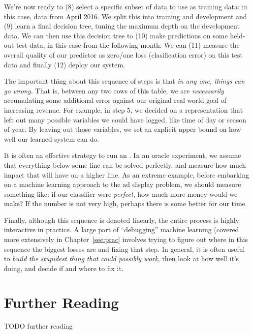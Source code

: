We're now ready to (8) select a specific subset of data to use as training data: in this case, data from April 2016. We split this into training and development and (9) learn a final decision tree, tuning the maximum depth on the development data. We can then use this decision tree to (10) make predictions on some held-out test data, in this case from the following month. We can (11) measure the overall quality of our predictor as zero/one loss (clasification error) on this test data and finally (12) deploy our system.

The important thing about this sequence of steps is that \emph{in any one, things can go wrong.} That is, between any two rows of this table, we are \emph{necessarily} accumulating some additional error against our original real world goal of increasing revenue. For example, in step 5, we decided on a representation that left out many possible variables we could have logged, like time of day or season of year. By leaving out those variables, we set an explicit upper bound on how well our learned system can do.

It is often an effective strategy to run an . In an oracle experiment, we assume that everything below some line can be solved perfectly, and measure how much impact that will have on a higher line. As an extreme example, before embarking on a machine learning approach to the ad display problem, we should measure something like: if our classifier were \emph{perfect}, how much more money would we make? If the number is not very high, perhaps there is some better for our time.

Finally, although this sequence is denoted linearly, the entire process is highly interactive in practice. A large part of ``debugging'' machine learning (covered more extensively in Chapter~\ref{sec:prac} involves trying to figure out where in this sequence the biggest losses are and fixing that step. In general, it is often useful to \emph{build the stupidest thing that could possibly work}, then look at how well it's doing, and decide if and where to fix it.


\section{Further Reading}

TODO further reading


